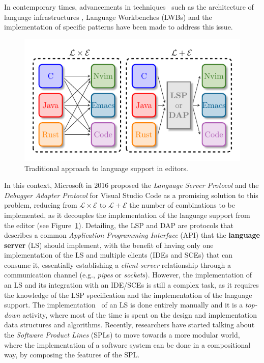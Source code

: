 In contemporary times, advancements in techniques~\cite{Rask21a} such as the architecture of language infrastructures \cite{Lammel18, Voelter13}, Language Workbenches (LWBs) \cite{Erdweg13b} and the implementation of specific patterns \cite{Basten15, Mernik05, Parr09} have been made to address this issue.
\hfill \break
\begin{figure}[t]
    \centering
    \includegraphics[width=0.75\linewidth]{figs/lsp_combinations.pdf}
    \caption{Traditional approach to language support in editors.}
    \label{fig:traditional}
\end{figure}
In this context, Microsoft in 2016 proposed the \textit{Language Server Protocol} and the \textit{Debugger Adapter Protocol} for Visual Studio Code as a promising solution to this problem, reducing from $\mathcal{L} \times \mathcal{E}$ to $\mathcal{L} + \mathcal{E}$ the number of combinations to be implemented, as it decouples the implementation of the language support from the editor (see Figure~\ref{fig:traditional}).
Detailing, the LSP and DAP are protocols that describes a common \textit{Application Programming Interface} (API) that the \textbf{language server} (LS) should implement, with the benefit of having only one implementation of the LS and multiple clients (IDEs and SCEs) that can consume it, essentially establishing a \textit{client-server} relationship through a communication channel (e.g., \textit{pipes} or \textit{sockets}).
However, the implementation of an LS and its integration with an IDE/SCEs is still a complex task, as it requires the knowledge of the LSP specification and the implementation of the language support.
The implementation~\cite{Gunasinghe22} of an LS is done entirely manually and it is a \textit{top-down} activity, where most of the time is spent on the design and implementation data structures and algorithms.
Recently, researchers have started talking about the \textit{Software Product Lines} (SPLs) \cite{Cazzola23d, Cazzola20} to move towards a more modular world, where the implementation of a software system can be done in a compositional way, by composing the features of the SPL.
